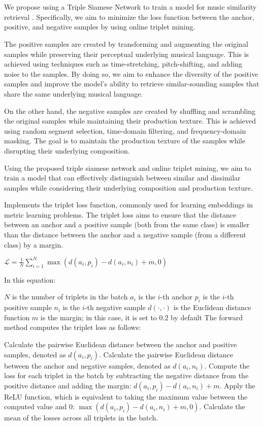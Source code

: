 \section{}

We propose using a Triple Siamese Network to train a model for music similarity retrieval \cite{contentmusicsimtriplet2020}. Specifically, we aim to minimize the loss function between the anchor, positive, and negative samples by using online triplet mining.

The positive samples are created by transforming and augmenting the original samples while preserving their perceptual underlying musical language. This is achieved using techniques such as time-stretching, pitch-shifting, and adding noise to the samples. By doing so, we aim to enhance the diversity of the positive samples and improve the model's ability to retrieve similar-sounding samples that share the same underlying musical language.

On the other hand, the negative samples are created by shuffling and scrambling the original samples while maintaining their production texture. This is achieved using random segment selection, time-domain filtering, and frequency-domain masking. The goal is to maintain the production texture of the samples while disrupting their underlying composition.

Using the proposed triple siamese network and online triplet mining, we aim to train a model that can effectively distinguish between similar and dissimilar samples while considering their underlying composition and production texture.

 Implements the triplet loss function, commonly used for learning embeddings in metric learning problems. The triplet loss aims to ensure that the distance between an anchor and a positive sample (both from the same class) is smaller than the distance between the anchor and a negative sample (from a different class) by a margin.

$\mathcal{L} = \frac{1}{N}\sum_{i=1}^{N} \max \left( d\left(a_i, p_i\right) - d\left(a_i, n_i\right) + m, 0 \right)$

In this equation:

$N$ is the number of triplets in the batch
$a_i$ is the $i$-th anchor
$p_i$ is the $i$-th positive sample
$n_i$ is the $i$-th negative sample
$d(\cdot, \cdot)$ is the Euclidean distance function
$m$ is the margin; in this case, it is set to 0.2 by default
The forward method computes the triplet loss as follows:

Calculate the pairwise Euclidean distance between the anchor and positive samples, denoted as $d(a_i, p_i)$.
Calculate the pairwise Euclidean distance between the anchor and negative samples, denoted as $d(a_i, n_i)$.
Compute the loss for each triplet in the batch by subtracting the negative distance from the positive distance and adding the margin: $d(a_i, p_i) - d(a_i, n_i) + m$.
Apply the ReLU function, which is equivalent to taking the maximum value between the computed value and 0: $\max \left( d(a_i, p_i) - d(a_i, n_i) + m, 0 \right)$.
Calculate the mean of the losses across all triplets in the batch.